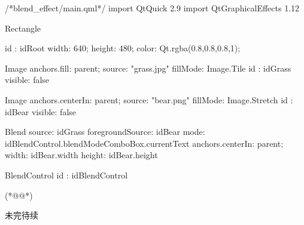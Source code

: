 \label{f000052}    %
\FloatBarrier                                  %
\begin{thebookfilesourceone}[escapeinside={(*@}{@*)},
caption=GoodLuck,
title=\filesourcenumbernameone \thefilesourcenumber
]
/*blend_effect/main.qml*/
import QtQuick 2.9
import QtGraphicalEffects 1.12

Rectangle {
    id : idRoot
    width: 640;
    height: 480;
    color: Qt.rgba(0.8,0.8,0.8,1);

    Image{
        anchors.fill: parent;
        source: "grass.jpg"
        fillMode: Image.Tile
        id : idGrass
        visible: false
    }

    Image{
        anchors.centerIn: parent;
        source: "bear.png"
        fillMode: Image.Stretch
        id : idBear
        visible: false
    }

    Blend{
        source: idGrass
        foregroundSource: idBear
        mode: idBlendControl.blendModeComboBox.currentText
        anchors.centerIn: parent;
        width: idBear.width
        height: idBear.height
    }

    BlendControl {
        id : idBlendControl
    }

}(*@\marginpar[\hfill\setlength\fboxsep{2pt}\fbox{\footnotesize{\kaishu\parbox{1em}{\setlength{\baselineskip}{2pt}\filesourcenumbernameone}}\footnotesize{\thefilesourcenumber}}]{\setlength\fboxsep{2pt}\fbox{\footnotesize{\kaishu\parbox{1em}{\setlength{\baselineskip}{2pt}\filesourcenumbernameone}}\footnotesize{\thefilesourcenumber}}}@*)\end{thebookfilesourceone}          %
\addtocounter{lstlisting}{-1}   %


未完待续









